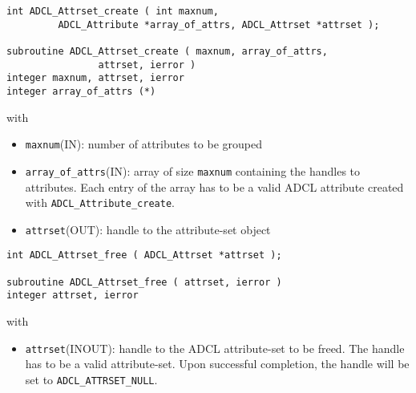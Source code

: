 \begin{verbatim}
int ADCL_Attrset_create ( int maxnum, 
         ADCL_Attribute *array_of_attrs, ADCL_Attrset *attrset );

subroutine ADCL_Attrset_create ( maxnum, array_of_attrs, 
                attrset, ierror )
integer maxnum, attrset, ierror
integer array_of_attrs (*)
\end{verbatim}
with
\begin{itemize}
\item {\tt maxnum}(IN): number of attributes to be grouped
\item {\tt array\_of\_attrs}(IN): array of size {\tt maxnum} containing the handles to attributes. Each entry of the array has to be a valid ADCL attribute created with {\tt ADCL\_Attribute\_create}.
\item {\tt attrset}(OUT): handle to the attribute-set object
\end{itemize}
\hspace{1cm}
\begin{verbatim}
int ADCL_Attrset_free ( ADCL_Attrset *attrset );

subroutine ADCL_Attrset_free ( attrset, ierror )
integer attrset, ierror
\end{verbatim}
with
\begin{itemize}
\item {\tt attrset}(INOUT): handle to the ADCL attribute-set to be freed. The handle has to be a valid attribute-set.
    	Upon successful completion, the handle will be set to {\tt ADCL\_ATTRSET\_NULL}.
\end{itemize}